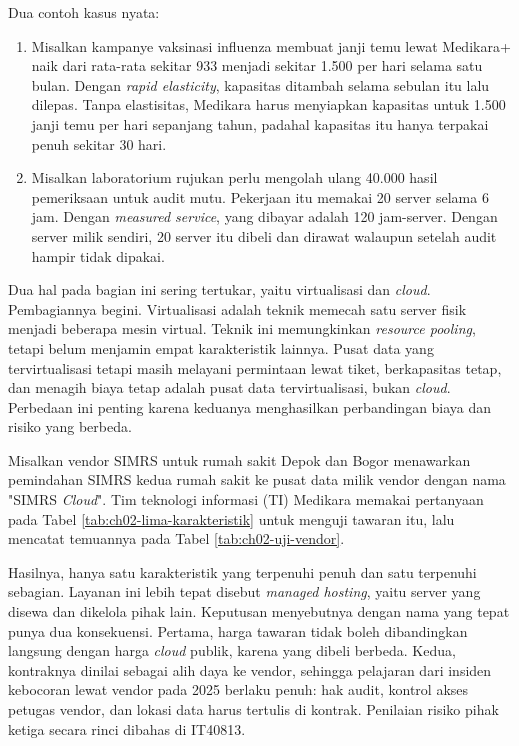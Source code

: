 Dua contoh kasus nyata:
\begin{enumerate}
  \item Misalkan kampanye vaksinasi influenza membuat janji temu lewat Medikara+ naik dari
        rata-rata sekitar 933 menjadi sekitar 1.500 per hari selama satu bulan. Dengan
        \textit{rapid elasticity}, kapasitas ditambah selama sebulan itu lalu dilepas. Tanpa
        elastisitas, Medikara harus menyiapkan kapasitas untuk 1.500 janji temu per hari
        sepanjang tahun, padahal kapasitas itu hanya terpakai penuh sekitar 30 hari.
  \item Misalkan laboratorium rujukan perlu mengolah ulang 40.000 hasil pemeriksaan untuk
        audit mutu. Pekerjaan itu memakai 20 server selama 6 jam. Dengan \textit{measured
        service}, yang dibayar adalah 120 jam-server. Dengan server milik sendiri, 20 server
        itu dibeli dan dirawat walaupun setelah audit hampir tidak dipakai.
\end{enumerate}

Dua hal pada bagian ini sering tertukar, yaitu virtualisasi dan \textit{cloud}.
Pembagiannya begini. Virtualisasi adalah teknik memecah satu server fisik menjadi beberapa
mesin virtual. Teknik ini memungkinkan \textit{resource pooling}, tetapi belum menjamin
empat karakteristik lainnya. Pusat data yang tervirtualisasi tetapi masih melayani
permintaan lewat tiket, berkapasitas tetap, dan menagih biaya tetap adalah pusat data
tervirtualisasi, bukan \textit{cloud}. Perbedaan ini penting karena keduanya menghasilkan
perbandingan biaya dan risiko yang berbeda.

\begin{kasus}[title={Kasus Medikara Health: Menguji "SIMRS Cloud" Milik Vendor}]
  Misalkan vendor SIMRS untuk rumah sakit Depok dan Bogor menawarkan pemindahan SIMRS kedua
  rumah sakit ke pusat data milik vendor dengan nama "SIMRS \textit{Cloud}". Tim teknologi
  informasi (TI) Medikara memakai pertanyaan pada Tabel \ref{tab:ch02-lima-karakteristik}
  untuk menguji tawaran itu, lalu mencatat temuannya pada Tabel \ref{tab:ch02-uji-vendor}.

  Hasilnya, hanya satu karakteristik yang terpenuhi penuh dan satu terpenuhi sebagian.
  Layanan ini lebih tepat disebut \textit{managed hosting}, yaitu server yang disewa dan
  dikelola pihak lain. Keputusan menyebutnya dengan nama yang tepat punya dua konsekuensi.
  Pertama, harga tawaran tidak boleh dibandingkan langsung dengan harga \textit{cloud}
  publik, karena yang dibeli berbeda. Kedua, kontraknya dinilai sebagai alih daya ke vendor,
  sehingga pelajaran dari insiden kebocoran lewat vendor pada 2025 berlaku penuh: hak audit,
  kontrol akses petugas vendor, dan lokasi data harus tertulis di kontrak. Penilaian risiko
  pihak ketiga secara rinci dibahas di IT40813.
\end{kasus}

